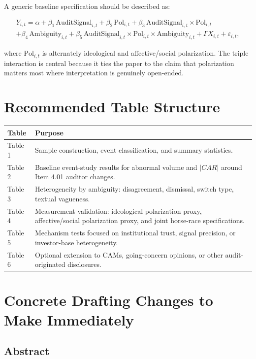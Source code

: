 \documentclass[12pt]{article}
\begin{document}
A generic baseline specification should be described as:

\begin{align*}
Y_{i,t} = \alpha + \beta_1 \, \text{AuditSignal}_{i,t} + \beta_2 \, \text{Pol}_{i,t} + \beta_3 \, \text{AuditSignal}_{i,t} \times \text{Pol}_{i,t} \\
+ \beta_4 \, \text{Ambiguity}_{i,t} + \beta_5 \, \text{AuditSignal}_{i,t} \times \text{Pol}_{i,t} \times \text{Ambiguity}_{i,t} + \Gamma X_{i,t} + \varepsilon_{i,t},
\end{align*}

where $\text{Pol}_{i,t}$ is alternately ideological and affective/social polarization. The triple interaction is central because it ties the paper to the claim that polarization matters most where interpretation is genuinely open-ended.

\section{Recommended Table Structure}

\begin{longtable}{p{} p{}}
\toprule
\textbf{Table} & \textbf{Purpose} \\
\midrule
Table 1 & Sample construction, event classification, and summary statistics. \\
Table 2 & Baseline event-study results for abnormal volume and $|CAR|$ around Item 4.01 auditor changes. \\
Table 3 & Heterogeneity by ambiguity: disagreement, dismissal, switch type, textual vagueness. \\
Table 4 & Measurement validation: ideological polarization proxy, affective/social polarization proxy, and joint horse-race specifications. \\
Table 5 & Mechanism tests focused on institutional trust, signal precision, or investor-base heterogeneity. \\
Table 6 & Optional extension to CAMs, going-concern opinions, or other audit-originated disclosures. \\
\bottomrule
\end{longtable}

\section{Concrete Drafting Changes to Make Immediately}

\subsection{Abstract}
\end{document}
